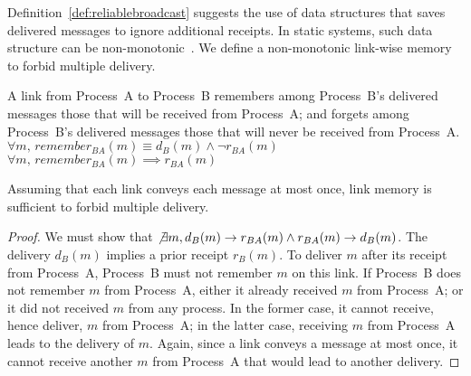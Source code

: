 Definition~\ref{def:reliablebroadcast} suggests the use of data structures that
saves delivered messages to ignore additional receipts. In static systems, such
data structure can be non-monotonic~\cite{raynal2013distributed}. We define a
non-monotonic link-wise memory to forbid multiple delivery.

\begin{definition}
  A link from Process~A to Process~B remembers among Process~B's delivered
  messages those that will be received from Process~A; and forgets among
  Process~B's delivered messages those that will never be received from
  Process~A.\\
  $\forall m,\, remember_{BA}(m) \equiv d_B(m) \wedge \neg r_{BA}(m)$ \\
  $\forall m,\, remember_{BA}(m) \implies r_{BA}(m)$
\end{definition}


\begin{theorem}
  Assuming that each link conveys each message at most once, link memory is
  sufficient to forbid multiple delivery.
\end{theorem}

\begin{proof}
  We must show that
  $\not\exists m, d_B(m) \rightarrow r_{BA}(m) \wedge r_{BA}(m) \rightarrow
  d_B(m)$.
  The delivery $d_B(m)$ implies a prior receipt $r_B(m)$.  To deliver $m$ after
  its receipt from Process~A, Process~B must not remember $m$ on this link.  If
  Process~B does not remember $m$ from Process~A, either it already received $m$
  from Process~A; or it did not received $m$ from any process. In the former
  case, it cannot receive, hence deliver, $m$ from Process~A; in the latter
  case, receiving $m$ from Process~A leads to the delivery of $m$. Again, since
  a link conveys a message at most once, it cannot receive another $m$ from
  Process~A that would lead to another delivery. 
\end{proof}


